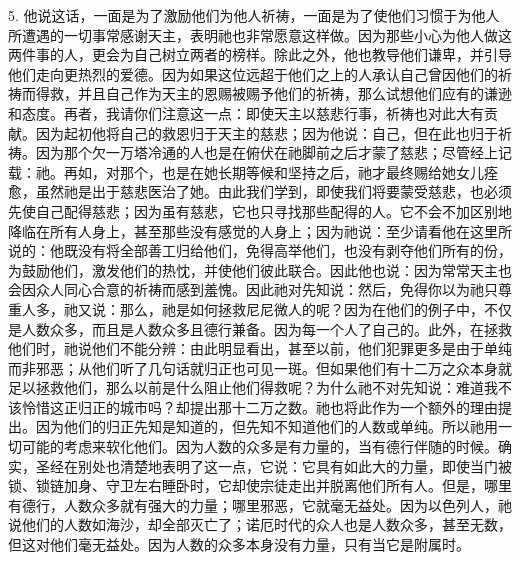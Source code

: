 5. 他说这话，一面是为了激励他们为他人祈祷，一面是为了使他们习惯于为他人所遭遇的一切事常感谢天主，表明祂也非常愿意这样做。因为那些小心为他人做这两件事的人，更会为自己树立两者的榜样。除此之外，他也教导他们谦卑，并引导他们走向更热烈的爱德。因为如果这位远超于他们之上的人承认自己曾因他们的祈祷而得救，并且自己作为天主的恩赐被赐予他们的祈祷，那么试想他们应有的谦逊和态度。再者，我请你们注意这一点：即使天主以慈悲行事，祈祷也对此大有贡献。因为起初他将自己的救恩归于天主的慈悲；因为他说：自己，但在此也归于祈祷。因为那个欠一万塔冷通的人也是在俯伏在祂脚前之后才蒙了慈悲；尽管经上记载：祂。再如，对那个，也是在她长期等候和坚持之后，祂才最终赐给她女儿痊愈，虽然祂是出于慈悲医治了她。由此我们学到，即使我们将要蒙受慈悲，也必须先使自己配得慈悲；因为虽有慈悲，它也只寻找那些配得的人。它不会不加区别地降临在所有人身上，甚至那些没有感觉的人身上；因为祂说：至少请看他在这里所说的：他既没有将全部善工归给他们，免得高举他们，也没有剥夺他们所有的份，为鼓励他们，激发他们的热忱，并使他们彼此联合。因此他也说：因为常常天主也会因众人同心合意的祈祷而感到羞愧。因此祂对先知说：然后，免得你以为祂只尊重人多，祂又说：那么，祂是如何拯救尼尼微人的呢？因为在他们的例子中，不仅是人数众多，而且是人数众多且德行兼备。因为每一个人了自己的。此外，在拯救他们时，祂说他们不能分辨：由此明显看出，甚至以前，他们犯罪更多是由于单纯而非邪恶；从他们听了几句话就归正也可见一斑。但如果他们有十二万之众本身就足以拯救他们，那么以前是什么阻止他们得救呢？为什么祂不对先知说：难道我不该怜惜这正归正的城市吗？却提出那十二万之数。祂也将此作为一个额外的理由提出。因为他们的归正先知是知道的，但先知不知道他们的人数或单纯。所以祂用一切可能的考虑来软化他们。因为人数的众多是有力量的，当有德行伴随的时候。确实，圣经在别处也清楚地表明了这一点，它说：它具有如此大的力量，即使当门被锁、锁链加身、守卫左右睡卧时，它却使宗徒走出并脱离他们所有人。但是，哪里有德行，人数众多就有强大的力量；哪里邪恶，它就毫无益处。因为以色列人，祂说他们的人数如海沙，却全部灭亡了；诺厄时代的众人也是人数众多，甚至无数，但这对他们毫无益处。因为人数的众多本身没有力量，只有当它是附属时。\par

